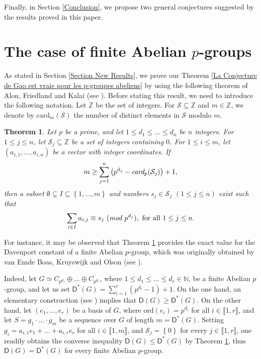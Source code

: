 \documentclass[english,12pt,a4paper,twoside]{smfart}
\theoremstyle{plain}
\newtheorem{theorem}{Theorem}[section]
\theoremstyle{definition}
\theoremstyle{remark}
\begin{document}
Finally, in Section \ref{Conclusion}, we propose two general conjectures suggested by the results proved in this paper.














\section{The case of finite Abelian $p$-groups}
\label{Section Main Theorem}
As stated in Section \ref{Section New Results}, we prove our Theorem \ref{La Conjecture de Gao est vraie pour les p-groupes abeliens} by using the following theorem of Alon, Friedland and Kalai (see \cite[Theorem A.$1$]{Alon84}). Before stating this result, we need to introduce the following notation. Let $\mathbb{Z}$ be the set of integers. For $\mathcal{S} \subseteq \mathbb{Z}$ and $m \in \mathbb{Z}$, we denote by $\text{card}_m(\mathcal{S})$ the number of distinct elements in $\mathcal{S}$ modulo $m$. 

\begin{theorem}\label{Theoreme Alon}
Let $p$ be a prime, and let $1 \leq d_1 \leq \dots \leq d_n$ be $n$ integers. For $1 \leq j \leq n$, let $\mathcal{S}_j \subseteq \mathbb{Z}$ be a set of integers containing $0$. For $1 \leq i \leq m$, let $(a_{i,1},\dots,a_{i,n})$ be a vector with integer coordinates. If
$$m \geq \displaystyle\sum^n_{j=1}\left(p^{d_j}-\text{\em card\em}_p(\mathcal{S}_j)\right)+1,$$
then a subset $\emptyset \subsetneq I \subseteq \left\{1,\dots,m\right\}$ and numbers $s_j \in \mathcal{S}_j$ $(1 \leq j \leq n)$ exist such that
$$\displaystyle\sum_{i \in I} a_{i,j} \equiv s_j \text{ } (\text{\em mod \em} p^{d_j}), \text{ for all } 1 \leq j \leq n.$$
\end{theorem}

For instance, it may be observed that Theorem \ref{Theoreme Alon} provides the exact value for the Davenport constant of a finite Abelian $p$-group, which was originally obtained by van Emde Boas, Kruyswijk and Olson (see \cite{EmdeBoas67,Olso69a}). 

\medskip
Indeed, let $G \simeq C_{p^{d_1}} \oplus \dots \oplus C_{p^{d_r}}$, where $1 \leq d_1 \leq \dots \leq d_r \in \mathbb{N}$, be a finite Abelian $p$-group, and let us set $\mathsf{D}^*(G)=\sum^r_{i=1} \left(p^{d_i}-1\right)+1.$ On the one hand, an elementary construction (see \cite[Proposition $5.1.8$]{GeroKoch05}) implies that $\mathsf{D}(G) \geq \mathsf{D}^*(G)$. On the other hand, let $(e_1,\dots,e_r)$ be a basis of $G$, where $\text{ord}(e_i)=p^{d_i}$ for all $i \in \llbracket 1,r \rrbracket$, and let $S=g_1 \cdot \hdots \cdot g_m$ be a sequence over $G$ of length $m=\mathsf{D}^*(G)$. Setting $g_i=a_{i,1}e_1 + \dots + a_{i,r}e_r$ for all $i \in \llbracket 1,m \rrbracket$, and $\mathcal{S}_j=\left\{0\right\}$ for every $j \in \llbracket 1,r \rrbracket$, one readily obtains the converse inequality $\mathsf{D}(G) \leq \mathsf{D}^*(G)$ by Theorem \ref{Theoreme Alon}, thus $\mathsf{D}(G) = \mathsf{D}^*(G)$ for every finite Abelian $p$-group. 
\end{document}
